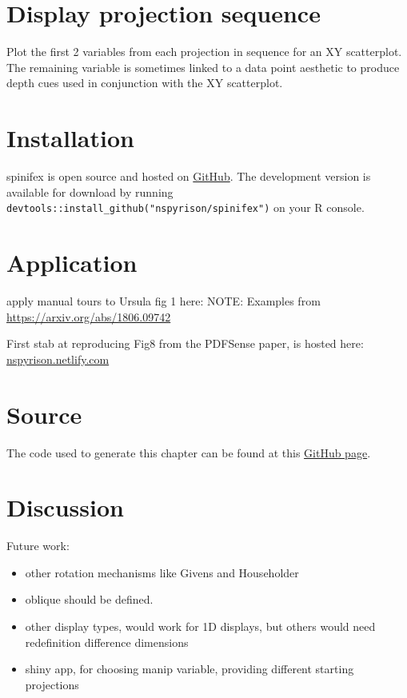 \documentclass{monashthesis}
\begin{document}
\hypertarget{display-projection-sequence}{%
\section{Display projection sequence}\label{display-projection-sequence}}

Plot the first 2 variables from each projection in sequence for an XY scatterplot. The remaining variable is sometimes linked to a data point aesthetic to produce depth cues used in conjunction with the XY scatterplot.

\hypertarget{installation}{%
\section{Installation}\label{installation}}

spinifex is open source and hosted on \href{https://github.com/nspyrison/spinifex}{GitHub}. The development version is available for download by running \texttt{devtools::install\_github("nspyrison/spinifex")}
on your R console.

\hypertarget{application}{%
\section{Application}\label{application}}

apply manual tours to Ursula fig 1 here:
NOTE: Examples from \url{https://arxiv.org/abs/1806.09742}

First stab at reproducing Fig8 from the PDFSense paper, is hosted here:
\href{https://nspyrison.netlify.com/else/pdfsense_fig8repex/}{nspyrison.netlify.com}

\hypertarget{source}{%
\section{Source}\label{source}}

The code used to generate this chapter can be found at this \href{https://github.com/nspyrison/Confirmation/blob/master/03-spinifex.Rmd}{GitHub page}.

\hypertarget{discussion}{%
\section{Discussion}\label{discussion}}

Future work:

\begin{itemize}
\tightlist
\item
  other rotation mechanisms like Givens and Householder
\item
  oblique should be defined.
\item
  other display types, would work for 1D displays, but others would need redefinition difference dimensions
\item
  shiny app, for choosing manip variable, providing different starting projections
\end{itemize}
\end{document}
